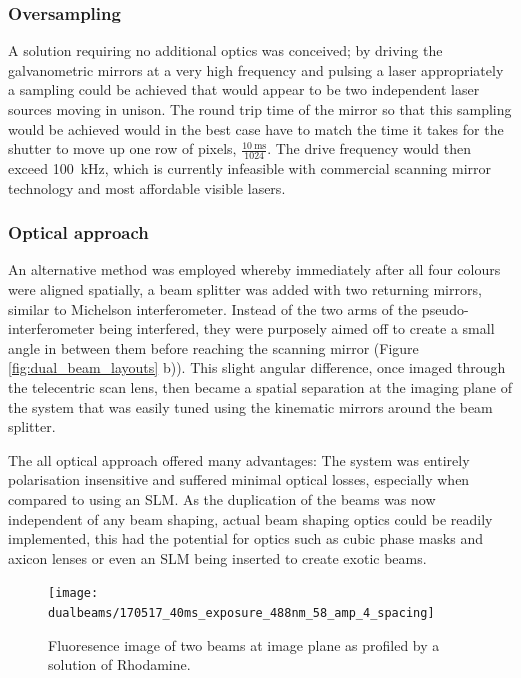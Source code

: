 \subsubsection{Oversampling}
A solution requiring no additional optics was conceived; by driving the galvanometric mirrors at a very high frequency and pulsing a laser appropriately a sampling could be achieved that would appear to be two independent laser sources moving in unison.
The round trip time of the mirror so that this sampling would be achieved would in the best case have to match the time it takes for the shutter to move up one row of pixels, $\frac{\SI{10}{\milli\second}}{1024}$.
The drive frequency would then exceed \SI{100}{\kilo\hertz}, which is currently infeasible with commercial scanning mirror technology and most affordable visible lasers.

\subsubsection{Optical approach}
An alternative method was employed whereby immediately after all four colours were aligned spatially, a beam splitter was added with two returning mirrors, similar to Michelson interferometer.
Instead of the two arms of the pseudo-interferometer being interfered, they were purposely aimed off to create a small angle in between them before reaching the scanning mirror (Figure \ref{fig:dual_beam_layouts} b)).
This slight angular difference, once imaged through the telecentric scan lens, then became a spatial separation at the imaging plane of the system that was easily tuned using the kinematic mirrors around the beam splitter.

The all optical approach offered many advantages: The system was entirely polarisation insensitive and suffered minimal optical losses, especially when compared to using an SLM.
As the duplication of the beams was now independent of any beam shaping, actual beam shaping optics could be readily implemented, this had the potential for optics such as cubic phase masks and axicon lenses or even an SLM being inserted to create exotic beams.

\begin{figure}
  \centering
  \texttt{[image: dualbeams/170517\_40ms\_exposure\_488nm\_58\_amp\_4\_spacing]}
  \caption{Fluoresence image of two beams at image plane as profiled by a solution of Rhodamine.}
  \label{}
\end{figure}

